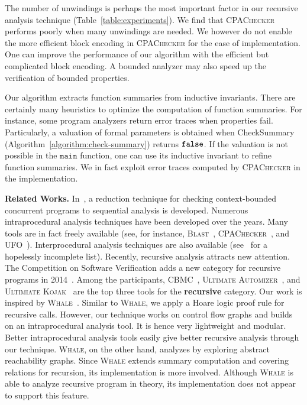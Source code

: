 
The number of unwindings is perhaps the most important factor in our
recursive analysis technique (Table~\ref{table:experiments}). We find
that \textsc{CPAChecker} performs poorly when many unwindings are
needed. We however do not enable the more efficient block encoding in
\textsc{CPAChecker} for the ease of implementation. One can improve
the performance of our algorithm with the efficient but complicated
block encoding. A bounded analyzer may also speed up the
verification of bounded properties. 

Our algorithm extracts function summaries from inductive invariants. 
There are certainly many heuristics to optimize the computation of
function summaries. For instance, some program analyzers return error
traces when properties fail. Particularly, a valuation of formal
parameters is obtained when \textmd{CheckSummary}
(Algorithm~\ref{algorithm:check-summary}) returns $\mathtt{false}$. If the
valuation is not possible in the $\mathtt{main}$ function, one can use
its inductive invariant to refine function summaries. We in 
fact exploit error traces computed by \textsc{CPAChecker} in the
implementation. 

\noindent
\textbf{Related Works.}
In~\cite{LalR08,LalR09}, a reduction technique for checking context-bounded concurrent programs to sequential analysis is developed. Numerous intraprocedural analysis techniques have been developed over the years. Many tools are in fact freely available (see, for instance, \textsc{Blast}~\cite{BeyerHJM07}, \textsc{CPAChecker}~\cite{BeyerK11}, and \textsc{UFO}~\cite{AlbarghouthiLGC12}). Interprocedural analysis techniques are also available (see~\cite{RepsHS95,BallR01,CousotCFMMMR05,CuoqKKPSY12,coverity,polyspace} for a hopelessly incomplete list). Recently, recursive analysis attracts new attention. The Competition on Software Verification adds a new category for recursive programs in 2014~\cite{svcomp14}. Among the participants, \textsc{CBMC}~\cite{ClarkeKL04}, \textsc{Ultimate Automizer}~\cite{HeizmannCDEHLNSP13}, and \textsc{Ultimiate Kojak}~\cite{Kojak} are the top three tools for the \textbf{recursive} category. Our work is inspired by \textsc{Whale}~\cite{AlbarghouthiGC12}. Similar to \textsc{Whale}, we apply a Hoare logic proof rule for recursive calls. However, our technique works on control flow graphs and builds on an intraprocedural analysis tool. It is hence very lightweight and modular. Better intraprocedural analysis tools easily give better recursive analysis through our technique. \textsc{Whale}, on the other hand, analyzes by exploring abstract reachability graphs. Since \textsc{Whale} extends summary computation and covering relations for recursion, its implementation is more involved. Although \textsc{Whale} is able to analyze recursive program in theory, its implementation does not appear to support this feature.
